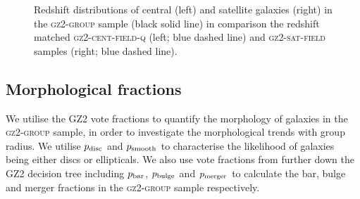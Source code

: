 \documentclass[useAMS,usenatbib]{mn2e}
\begin{document}
\begin{figure}
\caption[Redshift distribution of galaxies in the \textsc{gz2-group} sample]{Redshift distributions of central (left) and satellite galaxies (right) in the \textsc{gz2-group} sample (black solid line) in comparison the redshift matched \textsc{gz2-cent-field-q} (left; blue dashed line) and \textsc{gz2-sat-field} samples (right; blue dashed line).}
\label{fig:zcompare}
\end{figure}

\subsection{Morphological fractions}\label{sec:morphfrac}

We utilise the GZ2 vote fractions to quantify the morphology of galaxies in the \textsc{gz2-group} sample, in order to investigate the morphological trends with group radius. We utilise $p_{\rm{disc}}$ and $p_{\rm{smooth}}$ to characterise the likelihood of galaxies being either discs or ellipticals. We also use vote fractions from further down the GZ2 decision tree including $p_{\rm{bar}}$, $p_{\rm{bulge}}$ and $p_{\rm{merger}}$ to calculate the bar, bulge and merger fractions in the \textsc{gz2-group} sample respectively. 
\end{document}
